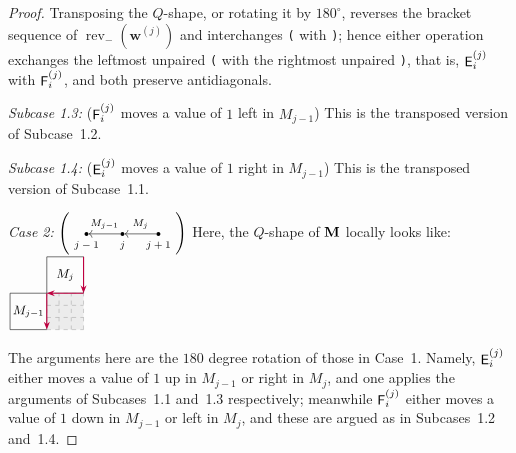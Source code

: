 \documentclass[12pt]{amsart}
\newcommand{\bs}{\boldsymbol}
\DeclareMathOperator{\mate}{\sf E}
\DeclareMathOperator{\matf}{\sf F}
\newcommand{\cell}{.28}
\newcommand{\phantomtile}[5]{%
\begin{scope}[shift={(#1,#2)}]
  \fill[gray!15] (0,0) rectangle ({#3*\cell},{#4*\cell});
  \draw[gray!70, dashed, step=\cell] (0,0) grid ({#3*\cell},{#4*\cell});
  #5
\end{scope}
}
\theoremstyle{definition}
\theoremstyle{remark}
\begin{document}
\begin{proof}
\smallskip
Transposing the $Q$-shape, or rotating it by $180^{\circ}$, reverses the bracket sequence
of $\operatorname{rev}_{-}({\bs w}^{(j)})$ and interchanges {\tt (} with {\tt )}; hence
either operation exchanges the leftmost unpaired {\tt (} with the rightmost unpaired
{\tt )}, that is, $\mate_i^{(j)}$ with $\matf_i^{(j)}$, and both preserve antidiagonals.

\smallskip
\noindent\emph{Subcase 1.3:} ($\matf_i^{(j)}$ moves a value of $1$ left in $M_{j-1}$) This
is the transposed version of Subcase~1.2.

\smallskip
\noindent\emph{Subcase 1.4:} ($\mate_i^{(j)}$ moves a value of $1$ right in $M_{j-1}$) This
is the transposed version of Subcase~1.1.

\medskip
\noindent
\emph{Case 2:} $\left(
\begin{tikzpicture}[baseline=-0.5ex]
\node[circle,fill,inner sep=1pt,label=below:{\scriptsize $j-1$}] (a) at (0,0) {};
\node[circle,fill,inner sep=1pt,label=below:{\scriptsize $j$}]   (b) at (.9,0) {};
\node[circle,fill,inner sep=1pt,label=below:{\scriptsize $j+1$}] (c) at (1.8,0) {};
\draw[<-] (a) -- node[above,font=\scriptsize] {$M_{j-1}$} (b);
\draw[<-] (b) -- node[above,font=\scriptsize] {$M_j$} (c);
\end{tikzpicture}\right)$
Here, the $Q$-shape of ${\bf M}$ locally looks like:
$\vcenter{\hbox{\begin{tikzpicture}[scale=1.1, baseline=-.5ex]
\draw (0,0) rectangle (.84,.84);
\node at (.42,.42) {\small $M_{j-1}$};
\draw (.84,.84) rectangle (1.68,1.68);
\node at (1.26,1.26) {\small{$M_j$}};
\phantomtile{.84}{0}{3}{3}{}
\draw[purple, -{Stealth[length=2mm,width=1.5mm]}, thick] (1.68,.84) -- (0.84,.84);
\draw[purple, -{Stealth[length=2mm,width=1.5mm]}, thick] (1.68,1.68) -- (1.68,.84);
\draw[purple, -{Stealth[length=2mm,width=1.5mm]}, thick] (.84,.84) -- (.84,0);
\end{tikzpicture}}}$

The arguments here are the $180$ degree rotation of those in Case~1. Namely,
$\mate^{(j)}_i$ either moves a value of $1$ up in $M_{j-1}$ or right in $M_j$, and one
applies the arguments of Subcases~1.1 and~1.3 respectively; meanwhile $\matf^{(j)}_i$
either moves a value of $1$ down in $M_{j-1}$ or left in $M_j$, and these are argued as in
Subcases~1.2 and~1.4.
\end{proof}
\end{document}

